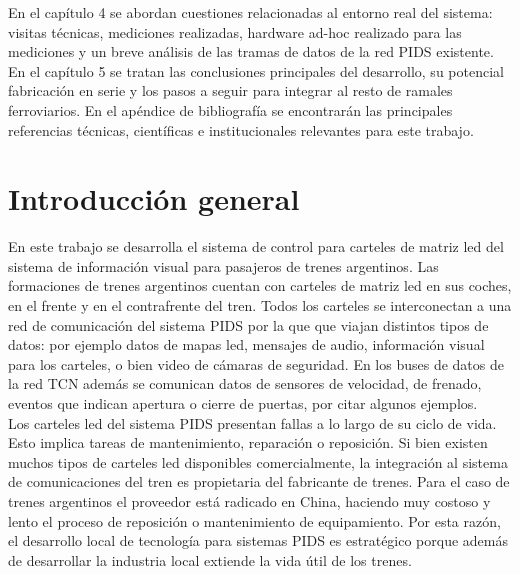 En el capítulo 4 se abordan cuestiones relacionadas al entorno real del sistema: visitas técnicas, mediciones realizadas, hardware ad-hoc realizado para las mediciones y un breve análisis de las tramas de datos de la red PIDS existente.\\

En el capítulo 5 se tratan las conclusiones principales del desarrollo, su potencial fabricación en serie y los pasos a seguir para integrar al resto de ramales ferroviarios. En el apéndice de bibliografía se encontrarán las principales referencias técnicas, científicas e institucionales relevantes para este trabajo.\\


\pagebreak
\section{Introducción general}
En este trabajo se desarrolla el sistema de control para carteles de matriz led del sistema de información visual para pasajeros de trenes argentinos. Las formaciones de trenes argentinos cuentan con carteles de matriz led en sus coches, en el frente y en el contrafrente del tren. Todos los carteles se interconectan a una red de comunicación del sistema PIDS por la que que viajan distintos tipos de datos: por ejemplo datos de mapas led, mensajes de audio, información visual para los carteles, o bien video de cámaras de seguridad. En los buses de datos de la red TCN además se comunican datos de sensores de velocidad, de frenado, eventos que indican apertura o cierre de puertas, por citar algunos ejemplos. \\

Los carteles led del sistema PIDS presentan fallas a lo largo de su ciclo de vida. Esto implica tareas de mantenimiento, reparación o reposición. Si bien existen muchos tipos de carteles led disponibles comercialmente, la integración al sistema de comunicaciones del tren es propietaria del fabricante de trenes. Para el caso de trenes argentinos el proveedor está radicado en China, haciendo muy costoso y lento el proceso de reposición o mantenimiento de equipamiento. Por esta razón, el desarrollo local de tecnología para sistemas PIDS es estratégico porque además de desarrollar la industria local extiende la vida útil de los trenes.\\


